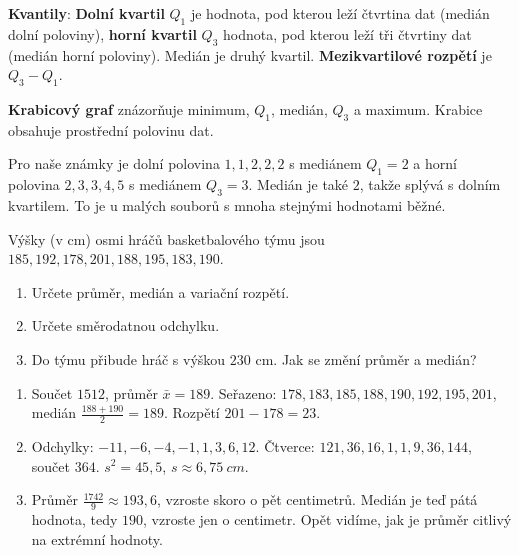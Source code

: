 \begin{definitionbox}
  \textbf{Kvantily}: \textbf{Dolní kvartil} $Q_1$ je hodnota, pod kterou leží čtvrtina dat (medián dolní poloviny), \textbf{horní kvartil} $Q_3$ hodnota, pod kterou leží tři čtvrtiny dat (medián horní poloviny). Medián je druhý kvartil. \textbf{Mezikvartilové rozpětí} je $Q_3 - Q_1$.

  \textbf{Krabicový graf} znázorňuje minimum, $Q_1$, medián, $Q_3$ a maximum. Krabice obsahuje prostřední polovinu dat.
\end{definitionbox}

\begin{center}
\end{center}

Pro naše známky je dolní polovina $1, 1, 2, 2, 2$ s mediánem $Q_1 = 2$ a horní polovina $2, 3, 3, 4, 5$ s mediánem $Q_3 = 3$. Medián je také $2$, takže splývá s dolním kvartilem. To je u malých souborů s mnoha stejnými hodnotami běžné.

\begin{problem}
  Výšky (v cm) osmi hráčů basketbalového týmu jsou $185, 192, 178, 201, 188, 195, 183, 190$.
  \begin{enumerate}[label=(\alph*)]
    \item Určete průměr, medián a variační rozpětí.
    \item Určete směrodatnou odchylku.
    \item Do týmu přibude hráč s výškou $230$ cm. Jak se změní průměr a medián?
  \end{enumerate}
\end{problem}

\begin{solution}
  \begin{enumerate}[label=(\alph*)]
    \item Součet $1512$, průměr $\bar{x} = 189$. Seřazeno: $178, 183, 185, 188, 190, 192, 195, 201$, medián $\frac{188 + 190}{2} = 189$. Rozpětí $201 - 178 = 23$.
    \item Odchylky: $-11, -6, -4, -1, 1, 3, 6, 12$. Čtverce: $121, 36, 16, 1, 1, 9, 36, 144$, součet $364$. $s^2 = 45{,}5$, $s\approx 6{,}75\ \si{cm}$.
    \item Průměr $\frac{1742}{9}\approx 193{,}6$, vzroste skoro o pět centimetrů. Medián je teď pátá hodnota, tedy $190$, vzroste jen o centimetr. Opět vidíme, jak je průměr citlivý na extrémní hodnoty.
  \end{enumerate}
\end{solution}

